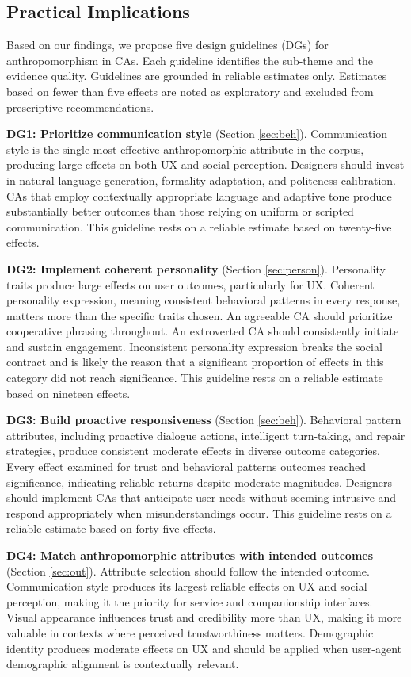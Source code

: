 \documentclass[lettersize,journal]{IEEEtran}
\begin{document}
\subsection{Practical Implications}

Based on our findings, we propose five design guidelines (DGs) for anthropomorphism in CAs. Each guideline identifies the sub-theme and the evidence quality. Guidelines are grounded in reliable estimates only. Estimates based on fewer than five effects are noted as exploratory and excluded from prescriptive recommendations.

\textbf{DG1: Prioritize communication style} (Section \ref{sec:beh}). Communication style is the single most effective anthropomorphic attribute in the corpus, producing large effects on both UX and social perception. Designers should invest in natural language generation, formality adaptation, and politeness calibration. CAs that employ contextually appropriate language and adaptive tone produce substantially better outcomes than those relying on uniform or scripted communication. This guideline rests on a reliable estimate based on twenty-five effects.

\textbf{DG2: Implement coherent personality} (Section \ref{sec:person}). Personality traits produce large effects on user outcomes, particularly for UX. Coherent personality expression, meaning consistent behavioral patterns in every response, matters more than the specific traits chosen. An agreeable CA should prioritize cooperative phrasing throughout. An extroverted CA should consistently initiate and sustain engagement. Inconsistent personality expression breaks the social contract and is likely the reason that a significant proportion of effects in this category did not reach significance. This guideline rests on a reliable estimate based on nineteen effects.

\textbf{DG3: Build proactive responsiveness} (Section \ref{sec:beh}). Behavioral pattern attributes, including proactive dialogue actions, intelligent turn-taking, and repair strategies, produce consistent moderate effects in diverse outcome categories. Every effect examined for trust and behavioral patterns outcomes reached significance, indicating reliable returns despite moderate magnitudes. Designers should implement CAs that anticipate user needs without seeming intrusive and respond appropriately when misunderstandings occur. This guideline rests on a reliable estimate based on forty-five effects.

\textbf{DG4: Match anthropomorphic attributes with intended outcomes} (Section \ref{sec:out}). Attribute selection should follow the intended outcome. Communication style produces its largest reliable effects on UX and social perception, making it the priority for service and companionship interfaces. Visual appearance influences trust and credibility more than UX, making it more valuable in contexts where perceived trustworthiness matters. Demographic identity produces moderate effects on UX and should be applied when user-agent demographic alignment is contextually relevant. 
\end{document}
